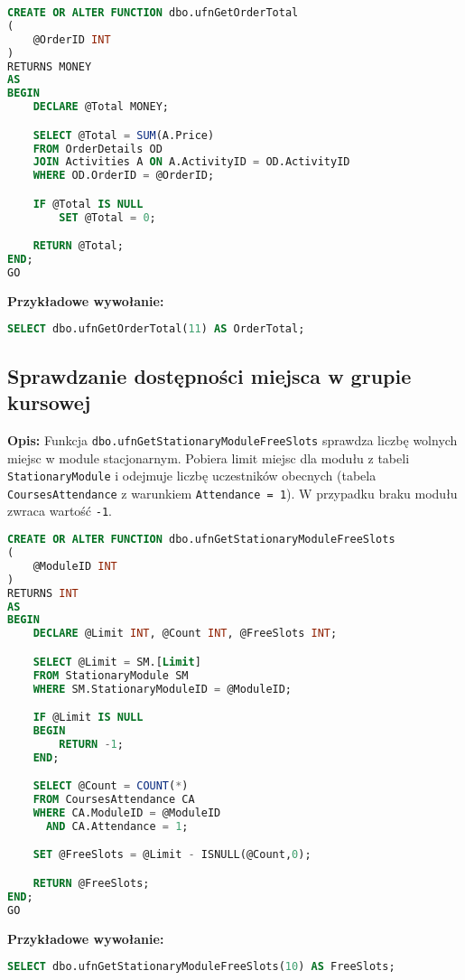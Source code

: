 \documentclass[12pt]{article}
\begin{document}
 
\begin{lstlisting}[language=SQL]
CREATE OR ALTER FUNCTION dbo.ufnGetOrderTotal
(
    @OrderID INT
)
RETURNS MONEY
AS
BEGIN
    DECLARE @Total MONEY;

    SELECT @Total = SUM(A.Price)
    FROM OrderDetails OD
    JOIN Activities A ON A.ActivityID = OD.ActivityID
    WHERE OD.OrderID = @OrderID;

    IF @Total IS NULL
        SET @Total = 0;

    RETURN @Total;
END;
GO
\end{lstlisting}

\textbf{Przykładowe wywołanie:}
\begin{lstlisting}[language=SQL]
SELECT dbo.ufnGetOrderTotal(11) AS OrderTotal;
\end{lstlisting}

\newpage

\subsection{Sprawdzanie dostępności miejsca w grupie kursowej}
\label{sec:stationary_module_free_slots}

\textbf{Opis:} Funkcja \texttt{dbo.ufnGetStationaryModuleFreeSlots} sprawdza liczbę wolnych miejsc w module stacjonarnym. Pobiera limit miejsc dla modułu z tabeli \texttt{StationaryModule} i odejmuje liczbę uczestników obecnych (tabela \texttt{CoursesAttendance} z warunkiem \texttt{Attendance = 1}). W przypadku braku modułu zwraca wartość \texttt{-1}.

 
\begin{lstlisting}[language=SQL]
CREATE OR ALTER FUNCTION dbo.ufnGetStationaryModuleFreeSlots
(
    @ModuleID INT  
)
RETURNS INT
AS
BEGIN
    DECLARE @Limit INT, @Count INT, @FreeSlots INT;

    SELECT @Limit = SM.[Limit]
    FROM StationaryModule SM
    WHERE SM.StationaryModuleID = @ModuleID;

    IF @Limit IS NULL
    BEGIN
        RETURN -1;
    END;

    SELECT @Count = COUNT(*)
    FROM CoursesAttendance CA
    WHERE CA.ModuleID = @ModuleID
      AND CA.Attendance = 1;

    SET @FreeSlots = @Limit - ISNULL(@Count,0);

    RETURN @FreeSlots;
END;
GO
\end{lstlisting}

\textbf{Przykładowe wywołanie:}
\begin{lstlisting}[language=SQL]
SELECT dbo.ufnGetStationaryModuleFreeSlots(10) AS FreeSlots;
\end{lstlisting}
\end{document}
